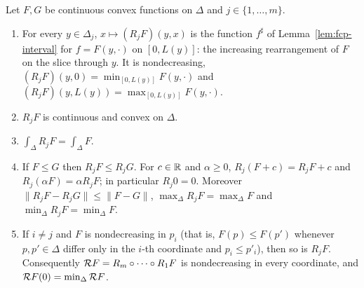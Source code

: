 \begin{lemma}[Properties of $R_j$]\label{lem:fcp-rearrangement}
Let $F,G$ be continuous convex functions on $\Delta$ and $j\in\{1,\dots,m\}$.
\begin{enumerate}[label=(\roman*)]
\item For every $y\in\Delta_j$, $x\mapsto(R_jF)(y,x)$ is the function $f^\sharp$ of Lemma~\ref{lem:fcp-interval} for
 $f=F(y,\cdot)$ on $[0,L(y)]$: the increasing rearrangement of $F$ on the slice through $y$. It is nondecreasing,
 $(R_jF)(y,0)=\min_{[0,L(y)]}F(y,\cdot)$ and $(R_jF)(y,L(y))=\max_{[0,L(y)]}F(y,\cdot)$.
\item $R_jF$ is continuous and convex on $\Delta$.
\item $\int_\Delta R_jF=\int_\Delta F$.
\item If $F\le G$ then $R_jF\le R_jG$. For $c\in\mathbb{R}$ and $\alpha\ge0$, $R_j(F+c)=R_jF+c$ and
 $R_j(\alpha F)=\alpha R_jF$; in particular $R_j0=0$. Moreover $\|R_jF-R_jG\|\le\|F-G\|$,
 $\max_\Delta R_jF=\max_\Delta F$ and $\min_\Delta R_jF=\min_\Delta F$.
\item If $i\ne j$ and $F$ is nondecreasing in $p_i$ (that is, $F(p)\le F(p')$ whenever $p,p'\in\Delta$ differ only in
 the $i$-th coordinate and $p_i\le p'_i$), then so is $R_jF$. Consequently $\mathcal{R} F=R_m\circ\dots\circ R_1F$ is
 nondecreasing in every coordinate, and $\mathcal{R} F(0)=\min_\Delta\mathcal{R} F$.
\end{enumerate}
\end{lemma}

